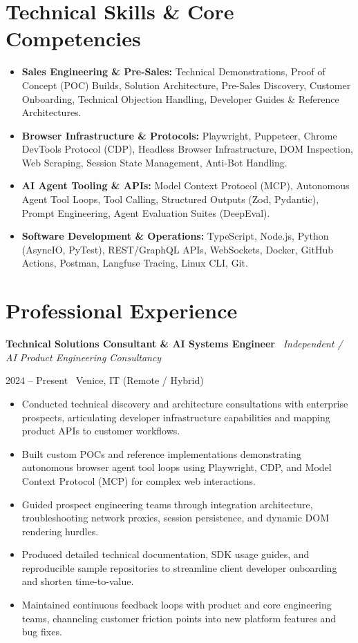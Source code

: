 \documentclass[a4paper,10pt]{article}
\newcommand{\role}[4]{%
  \vspace{2pt}\noindent
  \begin{minipage}[t]{0.70\textwidth}\raggedright\textbf{#1} \textbullet\ \textit{#3}\end{minipage}%
  \hfill
  \begin{minipage}[t]{0.28\textwidth}\raggedleft\footnotesize\color{gray}#2 \textbullet\ #4\end{minipage}%
  \vspace{1pt}%
}
\begin{document}
\section{Technical Skills \& Core Competencies}
\begin{itemize}[leftmargin=1.2em, itemsep=2pt]
  \item \textbf{Sales Engineering \& Pre-Sales:} Technical Demonstrations, Proof of Concept (POC) Builds, Solution Architecture, Pre-Sales Discovery, Customer Onboarding, Technical Objection Handling, Developer Guides \& Reference Architectures.
  \item \textbf{Browser Infrastructure \& Protocols:} Playwright, Puppeteer, Chrome DevTools Protocol (CDP), Headless Browser Infrastructure, DOM Inspection, Web Scraping, Session State Management, Anti-Bot Handling.
  \item \textbf{AI Agent Tooling \& APIs:} Model Context Protocol (MCP), Autonomous Agent Tool Loops, Tool Calling, Structured Outputs (Zod, Pydantic), Prompt Engineering, Agent Evaluation Suites (DeepEval).
  \item \textbf{Software Development \& Operations:} TypeScript, Node.js, Python (AsyncIO, PyTest), REST/GraphQL APIs, WebSockets, Docker, GitHub Actions, Postman, Langfuse Tracing, Linux CLI, Git.
\end{itemize}

\section{Professional Experience}

\role{Technical Solutions Consultant \& AI Systems Engineer}{2024 -- Present}{Independent / AI Product Engineering Consultancy}{Venice, IT (Remote / Hybrid)}
\begin{itemize}
  \item Conducted technical discovery and architecture consultations with enterprise prospects, articulating developer infrastructure capabilities and mapping product APIs to customer workflows.
  \item Built custom POCs and reference implementations demonstrating autonomous browser agent tool loops using Playwright, CDP, and Model Context Protocol (MCP) for complex web interactions.
  \item Guided prospect engineering teams through integration architecture, troubleshooting network proxies, session persistence, and dynamic DOM rendering hurdles.
  \item Produced detailed technical documentation, SDK usage guides, and reproducible sample repositories to streamline client developer onboarding and shorten time-to-value.
  \item Maintained continuous feedback loops with product and core engineering teams, channeling customer friction points into new platform features and bug fixes.
\end{itemize}
\end{document}

